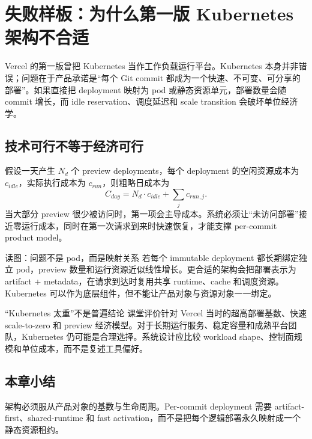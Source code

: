 \section{失败样板：为什么第一版 Kubernetes 架构不合适}

Vercel 的第一版曾把 Kubernetes 当作工作负载运行平台。Kubernetes 本身并非错误；问题在于产品承诺是“每个 Git commit 都成为一个快速、不可变、可分享的部署”。如果直接把 deployment 映射为 pod 或静态资源单元，部署数量会随 commit 增长，而 idle reservation、调度延迟和 scale transition 会破坏单位经济学。

\subsection{技术可行不等于经济可行}

假设一天产生 $N_d$ 个 preview deployments，每个 deployment 的空闲资源成本为 $c_{idle}$，实际执行成本为 $c_{run}$，则粗略日成本为
\[
C_{day}=N_d\cdot c_{idle}+\sum_j c_{run,j}.
\]
当大部分 preview 很少被访问时，第一项会主导成本。系统必须让“未访问部署”接近零运行成本，同时在第一次请求到来时快速恢复，才能支撑 per-commit product model。


\begin{knowledgebox}{读图：问题不是 pod，而是映射关系}
若每个 immutable deployment 都长期绑定独立 pod，preview 数量和运行资源近似线性增长。更合适的架构会把部署表示为 artifact + metadata，在请求到达时复用共享 runtime、cache 和调度资源。Kubernetes 可以作为底层组件，但不能让产品对象与资源对象一一绑定。
\end{knowledgebox}

\begin{warningbox}{“Kubernetes 太重”不是普遍结论}
课堂评价针对 Vercel 当时的超高部署基数、快速 scale-to-zero 和 preview 经济模型。对于长期运行服务、稳定容量和成熟平台团队，Kubernetes 仍可能是合理选择。系统设计应比较 workload shape、控制面规模和单位成本，而不是复述工具偏好。
\end{warningbox}


\subsection{本章小结}

架构必须服从产品对象的基数与生命周期。Per-commit deployment 需要 artifact-first、shared-runtime 和 fast activation，而不是把每个逻辑部署永久映射成一个静态资源租约。

